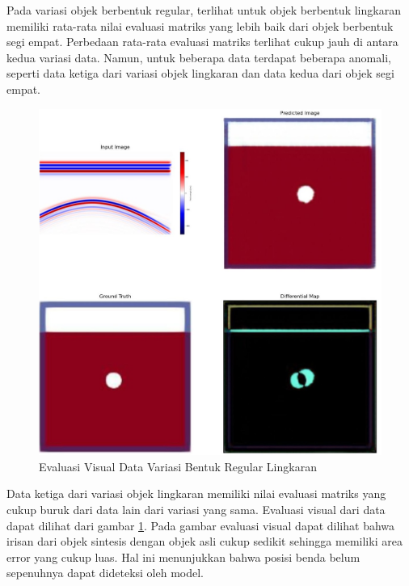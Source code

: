 \documentclass[conference]{IEEEtran}
\begin{document}
Pada variasi objek berbentuk regular, terlihat untuk objek berbentuk lingkaran memiliki rata-rata nilai evaluasi matriks yang lebih baik dari objek berbentuk segi empat. 
Perbedaan rata-rata evaluasi matriks terlihat cukup jauh di antara kedua variasi data. 
Namun, untuk beberapa data terdapat beberapa anomali, seperti data ketiga dari variasi objek lingkaran dan data kedua dari objek segi empat. 

\begin{figure}[ht]
  \centering
  \includegraphics[scale=0.15]{gambar/diffMapLingkaran.jpg}
  \caption{Evaluasi Visual Data Variasi Bentuk Regular Lingkaran}
  \label{fig:diffmaplingkaran}
\end{figure}

Data ketiga dari variasi objek lingkaran memiliki nilai evaluasi matriks yang cukup buruk dari data lain dari variasi yang sama. 
Evaluasi visual dari data dapat dilihat dari gambar \ref{fig:diffmaplingkaran}. 
Pada gambar evaluasi visual dapat dilihat bahwa irisan dari objek sintesis dengan objek asli cukup sedikit sehingga memiliki area error yang cukup luas. 
Hal ini menunjukkan bahwa posisi benda belum sepenuhnya dapat dideteksi oleh model.
\end{document}
